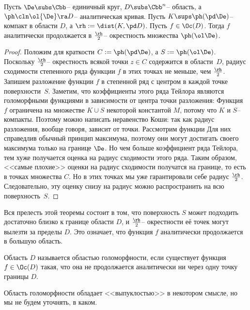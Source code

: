 \documentclass[a4paper]{article}
\begin{document}
\begin{theorem}
Пусть $\De \subs \Cbb$-- единичный круг, $D \subs \Cbb^n$-- область,
а $\ph\cln \ol{\De}\ra D$-- аналитическая кривая.
Пусть $K \sups \ph(\pd\De)$-- компакт в области $D$, а $\rh := \dist(K, \pd D)$.
Пусть $f \in \Oc(D)$. Тогда $f$ аналитически продолжается в $\frac\rh2$-- окрестность множества $\ph(\ol\De)$.
\end{theorem}
\begin{proof}
Положим для краткости $C := \ph(\pd\De)$, а $S := \ph(\ol\De)$.
Поскольку $\frac\rh2$-- окрестность всякой точки $z \in C$
содержится в области~$D$, радиус сходимости степенного ряда функции $f$ в этих точках не меньше,
чем $\frac\rh2$. Запишем разложение функции $f$ в степенной ряд с центром в каждой точке поверхности~$S$.
Заметим, что коэффициенты этого ряда Тейлора являются голоморфными функциями в зависимости от центра точки
разложения:
Функция $f$ ограничена на множестве $K \cup S$ некоторой константой $M$, потому что $K$ и $S$-- компакты.
Поэтому можно написать неравенство Коши:
так как радиус разложения, вообще говоря, зависит от точки.
Рассмотрим функции
Для них справедлив обычный принцип максимума, поэтому они могут достигать своего максимума
только на границе $\De$. Но чем больше коэффициент ряда Тейлора, тем хуже получается
оценка на радиус сходимости этого ряда. Таким образом, <<самые плохие>> оценки на радиус
сходимости получатся на границе, то есть в точках множества $C$. Но в этих точках
мы уже гарантировали себе радиус $\frac\rh2$. Следовательно, эту оценку снизу на радиус
можно распространить на всю поверхность~$S$.
\end{proof}

\begin{note}
Вся прелесть этой теоремы состоит в том, что поверхность $S$ может подходить достаточно
близко к границе области $D$, и $\frac\rh2$-- окрестности её точек могут вылезти за пределы $D$.
Это означает, что функция $f$ аналитически продолжается в большую область.
\end{note}

\begin{df}
Область $D$ называется областью голоморфности, если существует функция $f \in\Oc(D)$ такая,
что она не продолжается аналитически ни через одну точку границы $D$.
\end{df}

Область голоморфности обладает <<выпуклостью>> в некотором смысле, но мы не будем уточнять, в каком.
\end{document}
